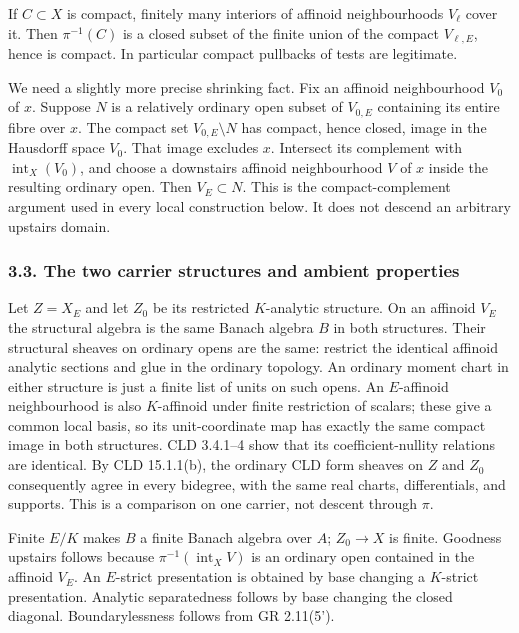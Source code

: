 \documentclass[
  11pt,
]{article}
\begin{document}
If \(C\subset X\) is compact, finitely many interiors of affinoid
neighbourhoods \(V_\ell\) cover it. Then \(\pi^{-1}(C)\) is a closed
subset of the finite union of the compact \(V_{\ell,E}\), hence is
compact. In particular compact pullbacks of tests are legitimate.

We need a slightly more precise shrinking fact. Fix an affinoid
neighbourhood \(V_0\) of \(x\). Suppose \(N\) is a relatively ordinary
open subset of \(V_{0,E}\) containing its entire fibre over \(x\). The
compact set \(V_{0,E}\setminus N\) has compact, hence closed, image in
the Hausdorff space \(V_0\). That image excludes \(x\). Intersect its
complement with \(\operatorname{int}_X(V_0)\), and choose a downstairs
affinoid neighbourhood \(V\) of \(x\) inside the resulting ordinary
open. Then \(V_E\subset N\). This is the compact-complement argument
used in every local construction below. It does not descend an arbitrary
upstairs domain.

\subsubsection{3.3. The two carrier structures and ambient
properties}\label{the-two-carrier-structures-and-ambient-properties}

Let \(Z=X_E\) and let \(Z_0\) be its restricted \(K\)-analytic
structure. On an affinoid \(V_E\) the structural algebra is the same
Banach algebra \(B\) in both structures. Their structural sheaves on
ordinary opens are the same: restrict the identical affinoid analytic
sections and glue in the ordinary topology. An ordinary moment chart in
either structure is just a finite list of units on such opens. An
\(E\)-affinoid neighbourhood is also \(K\)-affinoid under finite
restriction of scalars; these give a common local basis, so its
unit-coordinate map has exactly the same compact image in both
structures. CLD 3.4.1--4 show that its coefficient-nullity relations are
identical. By CLD 15.1.1(b), the ordinary CLD form sheaves on \(Z\) and
\(Z_0\) consequently agree in every bidegree, with the same real charts,
differentials, and supports. This is a comparison on one carrier, not
descent through \(\pi\).

Finite \(E/K\) makes \(B\) a finite Banach algebra over \(A\);
\(Z_0\to X\) is finite. Goodness upstairs follows because
\(\pi^{-1}(\operatorname{int}_X V)\) is an ordinary open contained in
the affinoid \(V_E\). An \(E\)-strict presentation is obtained by base
changing a \(K\)-strict presentation. Analytic separatedness follows by
base changing the closed diagonal. Boundarylessness follows from GR
2.11(5').
\end{document}
